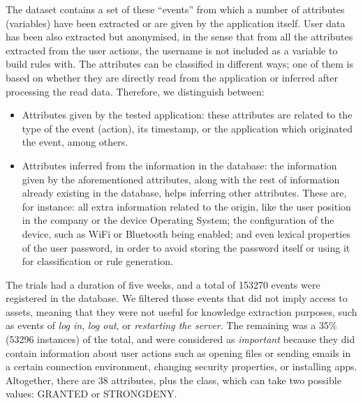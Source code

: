 \documentclass[runningheads]{llncs}
\begin{document}
The dataset contains a set of these ``events'' from which a number of attributes (variables) have been extracted or are given by the application itself. User data has been also extracted but anonymised, in the sense that from all the attributes extracted from the user actions, the username is not included as a variable to build rules with. The attributes can be classified in different ways; one of them is based on whether they are directly read from the application or inferred after processing the read data. Therefore, we distinguish between:
\begin{itemize}
  \item Attributes given by the tested application: these attributes
    are related to the type of the event (action), its timestamp, or
    the application which originated the event, among others. 
  \item Attributes inferred from the information in the database: the information given by the aforementioned attributes, along with the rest of information already existing in the database, helps inferring other attributes. These are, for instance: all extra information related to the origin, like the user position in the company or the device Operating System; the configuration of the device, such as WiFi or Bluetooth being enabled; and even lexical properties of the user password, in order to avoid storing the password itself or using it for classification or rule generation.
\end{itemize}

The trials had a duration of five weeks, and a total of 
153270 events were registered in the database. We filtered those events that did not imply access to assets, meaning that they were not useful for
knowledge extraction purposes, such as events of \textit{log in},
\textit{log out}, or \textit{restarting the server}.
The remaining was a 35\% (53296 instances) of the total, and were considered as \textit{important}
because they did contain information about user actions such as
opening files or sending emails in a certain connection environment,
changing security properties, or installing apps. Altogether, there
are 38 attributes, plus the class, which can take two possible values:
GRANTED or STRONGDENY. 

\end{document}
